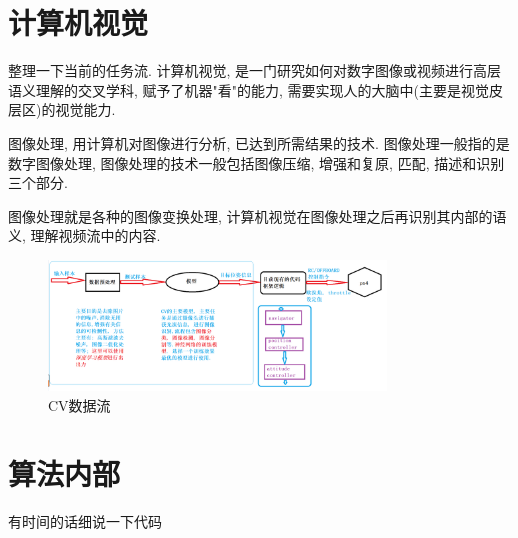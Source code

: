     \section{计算机视觉}
        整理一下当前的任务流.
      计算机视觉, 是一门研究如何对数字图像或视频进行高层语义理解的交叉学科, 赋予了机器"看"的能力, 需要实现人的大脑中(主要是视觉皮层区)的视觉能力. \par
      图像处理, 用计算机对图像进行分析, 已达到所需结果的技术. 图像处理一般指的是数字图像处理, 图像处理的技术一般包括图像压缩, 增强和复原, 匹配, 描述和识别三个部分. 
      \par 图像处理就是各种的图像变换处理, 计算机视觉在图像处理之后再识别其内部的语义, 理解视频流中的内容. 
    \begin{figure}[htbp]
        \centering
        \includegraphics[width=0.8\textwidth]{pictures/chapter2/CV_Flow.png}
        \caption{CV数据流}
    \end{figure}  
    \clearpage
    \section{算法内部}
        有时间的话细说一下代码
% 
